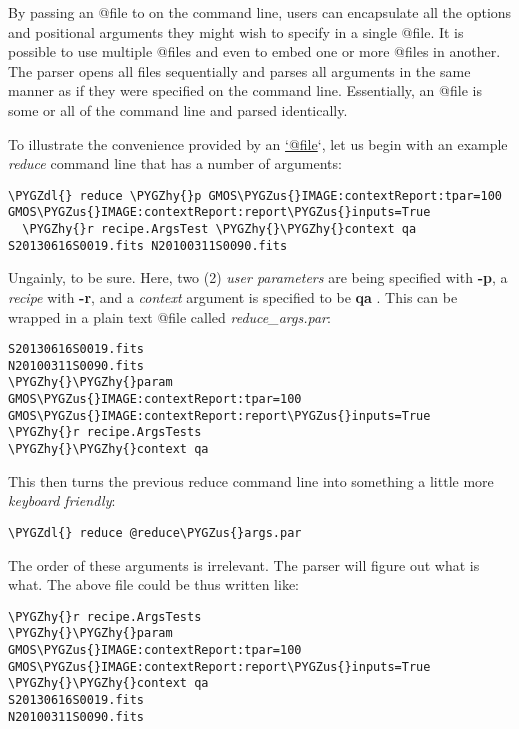 \documentclass[letterpaper,10pt,english]{sphinxmanual}
\def\PYGZus{\char`\_}
\def\PYGZdl{\char`\$}
\def\PYGZhy{\char`\-}
\begin{document}
By passing an @file to  on the command line, users can encapsulate all
the options and positional arguments they might wish to specify in a single
@file. It is possible to use multiple @files and even to embed one or more
@files in another. The parser opens all files sequentially and parses
all arguments in the same manner as if they were specified on the command line.
Essentially, an @file is some or all of the command line and parsed identically.

To illustrate the convenience provided by an \href{mailto:'@file}{`@file}`, let us begin with an
example \emph{reduce} command line that has a number of arguments:

\begin{Verbatim}[commandchars=\\\{\}]
\PYGZdl{} reduce \PYGZhy{}p GMOS\PYGZus{}IMAGE:contextReport:tpar=100 GMOS\PYGZus{}IMAGE:contextReport:report\PYGZus{}inputs=True
  \PYGZhy{}r recipe.ArgsTest \PYGZhy{}\PYGZhy{}context qa S20130616S0019.fits N20100311S0090.fits
\end{Verbatim}

Ungainly, to be sure. Here, two (2) \emph{user parameters} are being specified
with \textbf{-p}, a \emph{recipe} with \textbf{-r}, and a \emph{context} argument is specified
to be \textbf{qa} . This can be wrapped in a plain text @file called
\emph{reduce\_args.par}:

\begin{Verbatim}[commandchars=\\\{\}]
S20130616S0019.fits
N20100311S0090.fits
\PYGZhy{}\PYGZhy{}param
GMOS\PYGZus{}IMAGE:contextReport:tpar=100
GMOS\PYGZus{}IMAGE:contextReport:report\PYGZus{}inputs=True
\PYGZhy{}r recipe.ArgsTests
\PYGZhy{}\PYGZhy{}context qa
\end{Verbatim}

This then turns the previous reduce command line into something a little more
\emph{keyboard friendly}:

\begin{Verbatim}[commandchars=\\\{\}]
\PYGZdl{} reduce @reduce\PYGZus{}args.par
\end{Verbatim}

The order of these arguments is irrelevant. The parser will figure out what is
what. The above file could be thus written like:

\begin{Verbatim}[commandchars=\\\{\}]
\PYGZhy{}r recipe.ArgsTests
\PYGZhy{}\PYGZhy{}param
GMOS\PYGZus{}IMAGE:contextReport:tpar=100
GMOS\PYGZus{}IMAGE:contextReport:report\PYGZus{}inputs=True
\PYGZhy{}\PYGZhy{}context qa
S20130616S0019.fits
N20100311S0090.fits
\end{Verbatim}
\end{document}
